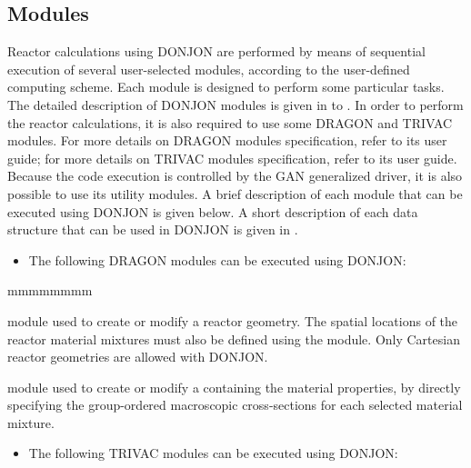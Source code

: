 \subsection{Modules}\label{sect:mod}

\vskip 0.2cm
Reactor calculations using DONJON are performed by means of
sequential execution of several user-selected modules, according to the
user-defined computing scheme.
Each module is designed to perform some particular tasks.
The detailed description of DONJON modules is given in 
to .
In order to perform the reactor calculations, it is also
required to use some DRAGON and TRIVAC modules.
For more details on DRAGON modules specification, refer to its user
guide\cite{dragon}; for more details on TRIVAC modules
specification, refer to its user guide\cite{trivac}.
Because the code execution is controlled by the GAN generalized driver,
it is also possible to use its utility modules\cite{gan1,dragon}.
A brief description
of each module that can be executed using DONJON is given below.
A short description of each data structure that can be used in DONJON
is given in .\\

\vskip 0.2cm
\begin{itemize}
\item  The following DRAGON modules can be executed using DONJON:
\end{itemize}

\vskip 0.2cm
\begin{ListeDeDescription}{mmmmmmmm}

\item[\moc{GEO:}] module used to create or modify a reactor geometry.
The spatial locations of the reactor material mixtures must also be defined
using the  module. Only  Cartesian reactor geometries
are allowed with DONJON.

\item[\moc{MAC:}] module used to create or modify a 
containing the material properties, by directly specifying the group-ordered
macroscopic cross-sections for each selected material mixture.

\end{ListeDeDescription}

\vskip 0.2cm
\begin{itemize}
\item  The following TRIVAC modules can be executed using DONJON:
\end{itemize}

